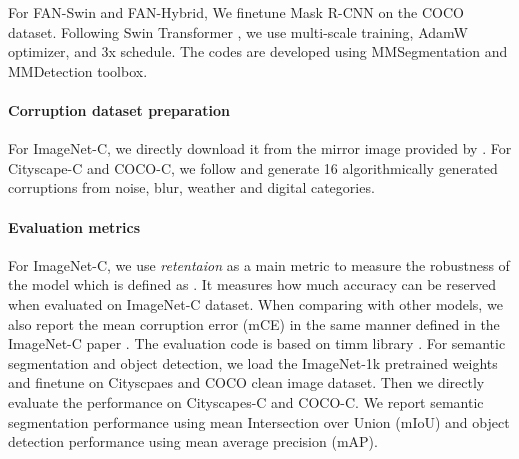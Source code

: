\documentclass[nohyperref]{article}
\theoremstyle{plain}
\theoremstyle{definition}
\theoremstyle{remark}
\begin{document}
For FAN-Swin and FAN-Hybrid, We finetune Mask R-CNN \cite{he2017mask}  on the
COCO dataset. Following Swin
Transformer \cite{liu2021swin}, we use multi-scale training, AdamW optimizer, and 3x schedule. The codes are developed using MMSegmentation \cite{contributors2020mmsegmentation} and MMDetection \cite{chen2019mmdetection} toolbox. 


\paragraph{Corruption dataset preparation}

For ImageNet-C, we directly download it from the mirror image provided by \citeauthor{hendrycks2019benchmarking}. For Cityscape-C and COCO-C, we follow \citeauthor{kamann2020benchmarking} and generate 16  algorithmically generated corruptions from noise, blur, weather and digital categories. 

\paragraph{Evaluation metrics} For ImageNet-C, we use \textit{retentaion} as a main metric to measure the robustness of the model which is defined as . It measures how much accuracy can be reserved when evaluated on ImageNet-C dataset. When comparing with other models, we also report the mean corruption error (mCE) in the same manner defined in the ImageNet-C paper \cite{hendrycks2019benchmarking}. The evaluation code is based on timm library \cite{rw2019timm}. For semantic segmentation and object detection, we load the ImageNet-1k pretrained weights and finetune on Cityscpaes and COCO clean image dataset. Then we directly evaluate the performance on Cityscapes-C and COCO-C. We report
semantic segmentation performance using mean Intersection over Union (mIoU) and object detection performance using mean average precision (mAP). 
\end{document}
